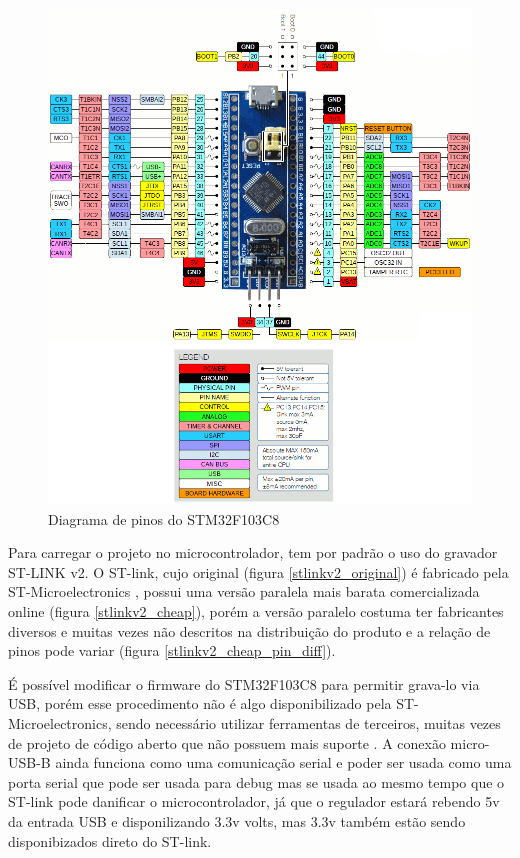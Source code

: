 \begin{figure}[ht]
	\centering
	\includegraphics[width=1.0\textwidth]{figures/stm32f1_pinout}
	\caption{Diagrama de pinos do STM32F103C8}
    \label{stm32f103c8_pinout}
\end{figure}

Para carregar o projeto no microcontrolador, tem por padrão o uso do gravador ST-LINK v2.
O ST-link, cujo original (figura \ref{stlinkv2_original}) é fabricado pela ST-Microelectronics \cite{st_link_v2}, 
possui uma versão paralela mais barata
comercializada online (figura \ref{stlinkv2_cheap}), porém a versão paralelo costuma ter fabricantes diversos e 
muitas vezes não descritos na distribuição do produto 
e a relação de pinos pode variar (figura \ref{stlinkv2_cheap_pin_diff}).

É possível modificar o firmware do STM32F103C8 para permitir grava-lo via USB, porém esse procedimento
não é algo disponibilizado pela ST-Microelectronics, sendo necessário utilizar ferramentas de terceiros,
muitas vezes de projeto de código aberto que não possuem mais suporte \cite{stm32duino_bootloader}.
A conexão micro-USB-B ainda funciona como uma comunicação serial e poder ser usada como uma porta serial que pode ser usada para debug
mas se usada ao mesmo tempo que o ST-link pode danificar o microcontrolador, já que o regulador estará rebendo 5v da entrada USB
e disponilizando 3.3v volts, mas 3.3v também estão sendo disponibizados direto do ST-link.

